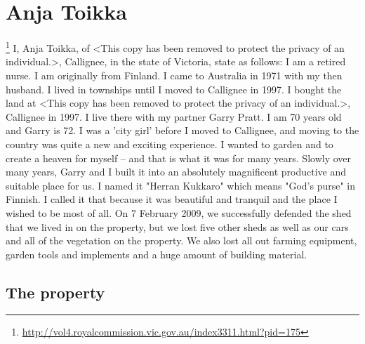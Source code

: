 \documentclass[a4paper]{article}
\begin{document}
\section{Anja Toikka}
        \footnote{\url{http://vol4.royalcommission.vic.gov.au/index3311.html?pid=175}}
        I, Anja Toikka, of <This copy has been removed to protect the privacy of an individual.>, Callignee, in the state of Victoria, state as follows:
        I am a retired nurse. I am originally from Finland. I came to Australia in 1971 with my then husband. I lived in townships until I moved to Callignee in 1997.
        I bought the land at <This copy has been removed to protect the privacy of an individual.>, Callignee in 1997. I live there with my partner Garry Pratt. I am 70 years old and Garry is 72. I was a 'city girl' before I moved to Callignee, and moving to the country was quite a new and exciting experience.
        I wanted to garden and to create a heaven for myself – and that is what it was for many years. Slowly over many years, Garry and I built it into an absolutely magnificent productive and suitable place for us. I named it "Herran Kukkaro" which means "God's purse" in Finnish. I called it that because it was beautiful and tranquil and the place I wished to be most of all.
        On 7 February 2009, we successfully defended the shed that we lived in on the property, but we lost five other sheds as well as our cars and all of the vegetation on the property. We also lost all out farming equipment, garden tools and implements and a huge amount of building material.

    \subsection{The property}
\end{document}
